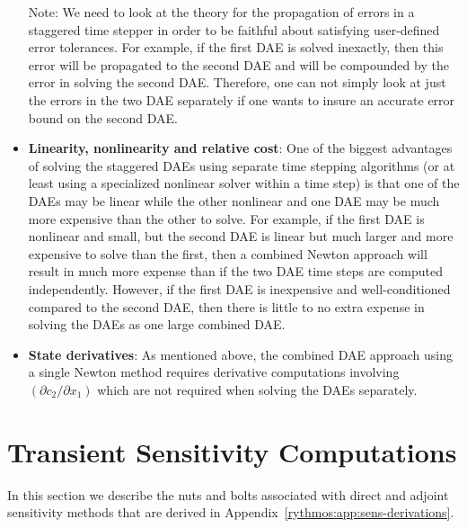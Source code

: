 \documentclass[pdf,ps2pdf,11pt]{SANDreport}
\begin{document}
\begin{itemize}
Note: We need to look at the theory for the propagation of errors in a
staggered time stepper in order to be faithful about satisfying user-defined
error tolerances.  For example, if the first DAE is solved inexactly, then
this error will be propagated to the second DAE and will be compounded by the
error in solving the second DAE.  Therefore, one can not simply look at just
the errors in the two DAE separately if one wants to insure an accurate error
bound on the second DAE.
%
{}\item {}\textbf{Linearity, nonlinearity and relative cost}: One of the
biggest advantages of solving the staggered DAEs using separate time stepping
algorithms (or at least using a specialized nonlinear solver within a time
step) is that one of the DAEs may be linear while the other nonlinear and one
DAE may be much more expensive than the other to solve.  For example, if the
first DAE is nonlinear and small, but the second DAE is linear but much larger
and more expensive to solve than the first, then a combined Newton approach
will result in much more expense than if the two DAE time steps are computed
independently.  However, if the first DAE is inexpensive and well-conditioned
compared to the second DAE, then there is little to no extra expense in
solving the DAEs as one large combined DAE.
%
{}\item {}\textbf{State derivatives}: As mentioned above, the combined DAE
approach using a single Newton method requires derivative computations
involving $({}\partial c_2 / {}\partial x_1)$ which are not required when
solving the DAEs separately.
%
\end{itemize}
%

\section{Transient Sensitivity Computations}
\label{rythmos:sec:trans-sens}

In this section we describe the nuts and bolts associated with direct and
adjoint sensitivity methods that are derived in
Appendix~\ref{rythmos:app:sens-derivations}.
\end{document}
